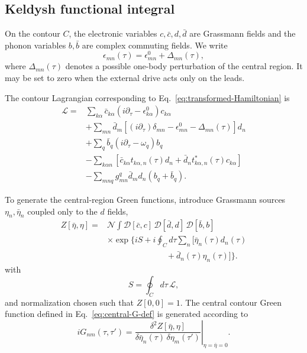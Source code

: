 \documentclass[
 reprint,
 superscriptaddress,
 amsmath,amssymb,
 aps,prb,
 longbibliography,
 floatfix
]{revtex4-2}
\begin{document}
\subsection{Keldysh functional integral}
\label{subsec:pf-functional}

On the contour \(C\), the electronic variables \(c,\bar c,d,\bar d\) are Grassmann fields and the phonon variables \(b,\bar b\) are complex commuting fields. We write
\begin{equation*}
\epsilon_{mn}(\tau)
=
\epsilon_{mn}^{0}
+
\Delta_{mn}(\tau),
\end{equation*}
where \(\Delta_{mn}(\tau)\) denotes a possible one-body perturbation of the central region. It may be set to zero when the external drive acts only on the leads.

The contour Lagrangian corresponding to Eq.~\eqref{eq:transformed-Hamiltonian} is
\begin{align*}
\mathcal L
={}&
\sum_{k\alpha}
\bar c_{k\alpha}
(i\partial_\tau-\epsilon_{k\alpha}^{0})
c_{k\alpha}
\\
&+
\sum_{mn}
\bar d_m
\left[
(i\partial_\tau)\delta_{mn}
-\epsilon_{mn}^{0}
-\Delta_{mn}(\tau)
\right]
d_n
\\
&+
\sum_q
\bar b_q(i\partial_\tau-\omega_q)b_q
\\
&-
\sum_{k\alpha n}
\left[
\bar c_{k\alpha}
t_{k\alpha,n}(\tau)d_n
+
\bar d_n
t_{k\alpha,n}^{*}(\tau)c_{k\alpha}
\right]
\\
&-
\sum_{mnq}
g_{mn}^{q}\bar d_m d_n
(b_q+\bar b_q).
\end{align*}

To generate the central-region Green functions, introduce Grassmann sources \(\eta_n,\bar\eta_n\) coupled only to the \(d\) fields,
\begin{equation*}
\begin{aligned}
Z[\bar\eta,\eta]
={}&
\mathcal N
\int
\mathcal D[\bar c,c]\,
\mathcal D[\bar d,d]\,
\mathcal D[\bar b,b]
\\
&\times
\exp\Bigg\{
iS
+
i\oint_C d\tau
\sum_n
\Big[
\bar\eta_n(\tau)d_n(\tau)
\\
&\hspace{3cm}
+
\bar d_n(\tau)\eta_n(\tau)
\Big]
\Bigg\}.
\end{aligned}
\end{equation*}
with
\begin{equation*}
S=\oint_C d\tau\,\mathcal L,
\end{equation*}
and normalization chosen such that \(Z[0,0]=1\). The central contour Green function defined in Eq.~\eqref{eq:central-G-def} is generated according to
\begin{equation*}
iG_{nm}(\tau,\tau')
=
\left.
\frac{\delta^2 Z[\bar\eta,\eta]}
{\delta\bar\eta_n(\tau)\,
 \delta\eta_m(\tau')}
\right|_{\eta=\bar\eta=0}.
\end{equation*}
\end{document}
